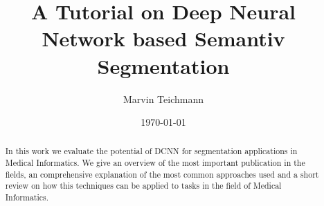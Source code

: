 \documentclass[a4paper,leqno]{scrartcl}
\title{A Tutorial on Deep Neural Network based Semantiv Segmentation}
\author{Marvin Teichmann}
\date{\today}
\begin{document}
\maketitle

\begin{abstract}
In this work we evaluate the potential of \gls{DCNN} for segmentation applications in Medical Informatics. We give an overview of the most important publication in the fields, an comprehensive explanation of the most common approaches used  and a short review on how this techniques can be applied to tasks in the field of Medical Informatics.
\end{abstract}


%





%



\newpage



\printglossaries
\end{document}
